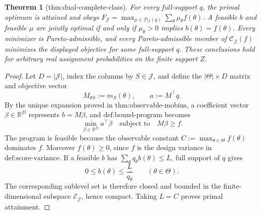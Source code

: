 \documentclass{article}
\newtheorem{theorem}{Theorem}
\begin{document}
\begin{theorem}[thm:dual-complete-class]\label{thm:dual-complete-class}
For every full-support \(q\), the primal optimum is attained and obeys \(F_{\mathcal J}=\max_{\mu\in\mathcal D_{\mathcal J}(q)}\sum_\theta\mu_\theta f(\theta)\). A feasible \(b\) and feasible \(\mu\) are jointly optimal if and only if \(\mu_\theta>0\) implies \(b(\theta)=f(\theta)\). Every minimizer is Pareto-admissible, and every Pareto-admissible member of \(\mathcal C_{\mathcal J}(f)\) minimizes the displayed objective for some full-support \(q\). These conclusions hold for arbitrary real assignment probabilities on the finite support \(Z\).
\end{theorem}
\begin{proof}
Let \(D=|\mathcal J|\), index the columns by \(S\in\mathcal J\), and define the \(|\Theta|\times D\) matrix and objective vector
\[
 M_{\theta S}:=m_S(\theta),\quad\quad a:=M^\top q.
\]
By the unique expansion proved in \(\text{thm:observable-mobius}\), a coefficient vector \(\beta\in\mathbb R^D\) represents \(b=M\beta\), and \(\text{def:bound-program}\) becomes
\[
 \min_{\beta\in\mathbb R^D}a^\top\beta
 \quad\text{subject to}\quad M\beta\ge f. \tag{1}
\]
The program is feasible because the observable constant \(C:=\max_{\theta\in\Theta}f(\theta)\) dominates \(f\).  Moreover \(f(\theta)\ge0\), since \(f\) is the design variance in \(\text{def:score-variance}\).  If a feasible \(b\) has \(\sum_\theta q_\theta b(\theta)\le L\), full support of \(q\) gives
\[
 0\le b(\theta)\le \frac{L}{q_\theta}\quad\quad(\theta\in\Theta). \tag{2}
\]
The corresponding sublevel set is therefore closed and bounded in the finite-dimensional subspace \(\mathcal E_{\mathcal J}\), hence compact.  Taking \(L=C\) proves primal attainment.


\end{proof}
\end{document}
